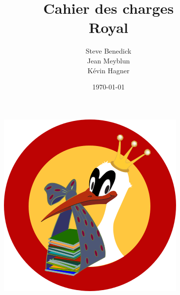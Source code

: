 \documentclass[a4paper]{article}
\title{Cahier des charges\\Royal}
\author{Steve Benedick\\Jean Meyblun\\Kévin Hagner}
\date\today
\begin{document}
\maketitle
\begin{figure}[h]
\begin{center}
\includegraphics{../img/logoRoyal.png}
\end{center}
\end{figure}

\newpage{}

\newpage{}

\tableofcontents
\newpage{}


\newpage{}


\newpage{}


\newpage{}


\newpage{}


\end{document}
